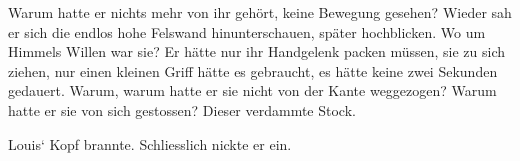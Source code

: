 Warum hatte er nichts mehr von ihr gehört, keine Bewegung
gesehen? Wieder sah er sich die endlos hohe Felswand hinunterschauen, später
hochblicken. Wo um Himmels Willen war sie?
Er hätte nur ihr Handgelenk packen müssen, sie zu sich ziehen, nur einen
kleinen Griff hätte es gebraucht, es hätte keine zwei Sekunden gedauert.
Warum, warum hatte er sie nicht von der Kante weggezogen? Warum hatte er sie von sich gestossen? Dieser
verdammte Stock.

Louis` Kopf brannte. Schliesslich nickte er ein. 
